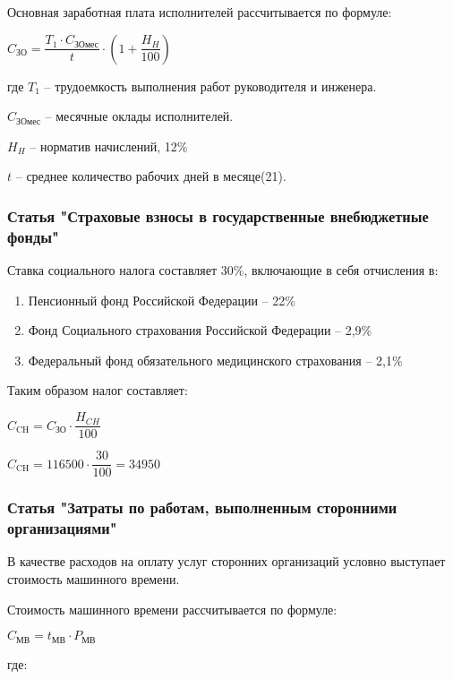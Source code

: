 Основная заработная плата исполнителей рассчитывается по формуле:

\begin{center}
$C_{ЗО} = \dfrac{T_{1} \cdot C_{ЗОмес}}{t} \cdot (1 + \dfrac{H_{H}}{100})$
\end{center}

где $T_{1}$ -- трудоемкость выполнения работ руководителя и инженера.

    $C_{\text{ЗОмес}}$ -- месячные оклады исполнителей.

    $H_{H}$ -- норматив начислений, 12\%

    $t$ -- среднее количество рабочих дней в месяце(21).

\subsubsection{Статья "Страховые взносы в государственные внебюджетные фонды"}

Ставка социального налога составляет 30\%, включающие в себя отчисления в:

\begin{enumerate}
  \item Пенсионный фонд Российской Федерации -- 22\%
  \item Фонд Социального страхования Российской Федерации -- 2,9\%
  \item Федеральный фонд обязательного медицинского страхования -- 2,1\%

\end{enumerate}
Таким образом налог составляет:

  $C_{\text{CH}} = C_{\text{ЗО}} \cdot \dfrac{H_{CH}}{100}$

  $C_{\text{CH}} = 116500 \cdot \dfrac{30}{100} = 34950$

\subsubsection{Статья "Затраты по работам, выполненным сторонними организациями"}

В качестве расходов на оплату услуг сторонних организаций условно выступает стоимость машинного времени.

Стоимость машинного времени рассчитывается по формуле:

\begin{center}
$C_{\text{МВ}} = t_{\text{МВ}} \cdot P_{\text{МВ}}$
\end{center}

где:

